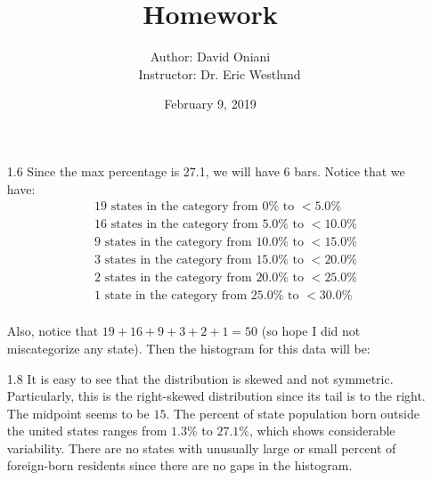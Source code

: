 \documentclass[11pt, a4paper]{article}
\title{\bf{Homework \textnumero 1}}
\author{Author: David Oniani
\\
\ \ \ Instructor: Dr. Eric Westlund}
\date{February 9, 2019}
\begin{document}
\maketitle
\begin{itemize}
\item[1.6]
Since the max percentage is 27.1, we will have 6 bars.
Notice that we have:
\begin{align*}
&19 \mbox{ states in the category from } 0\% \mbox{ to } < 5.0\%\\
&16 \mbox{ states in the category from } 5.0\% \mbox{ to } < 10.0\%\\
&9 \mbox{ states in the category from } 10.0\% \mbox{ to } < 15.0\%\\
&3 \mbox{ states in the category from } 15.0\% \mbox{ to } < 20.0\%\\
&2 \mbox{ states in the category from } 20.0\% \mbox{ to } < 25.0\%\\
&1 \mbox{ state in the category from } 25.0\% \mbox{ to } < 30.0\%\\
\end{align*}

Also, notice that $19 + 16 + 9 + 3 + 2 + 1 = 50$ (so hope I did not miscategorize any state).
Then the histogram for this data will be:

\begin{center}
\end{center}

\item[]
\item[]

\item[1.8]
It is easy to see that the distribution is skewed and not symmetric.
Particularly, this is the right-skewed distribution since its tail is to the right.
The midpoint seems to be $15$. The percent of state population born outside the united
states ranges from $1.3\%$ to $27.1\%$, which shows considerable variability.
There are no states with unusually large or small percent of foreign-born residents
since there are no gaps in the histogram.


\end{itemize}
\end{document}
